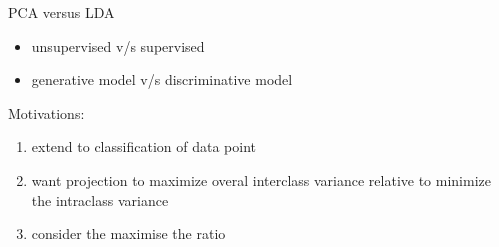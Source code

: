 \documentclass{article}
\begin{document}
PCA versus LDA
\begin{itemize}
\item unsupervised v/s supervised
\item generative model v/s discriminative model

\end{itemize}


Motivations:
\begin{enumerate}
\item extend to classification of data point
\item want projection to maximize overal interclass variance relative to minimize the intraclass variance
\item consider the maximise the ratio 
\end{enumerate}
\end{document}

